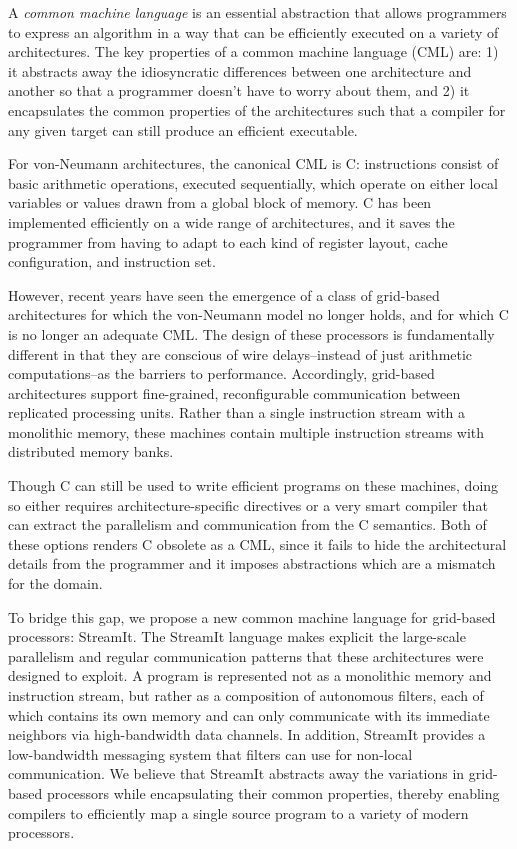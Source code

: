 \documentclass{sig-alternate}
\begin{document}
A {\it common machine language} is an essential abstraction that
allows programmers to express an algorithm in a way that can be
efficiently executed on a variety of architectures.  The key
properties of a common machine language (CML) are: 1) it abstracts
away the idiosyncratic differences between one architecture and
another so that a programmer doesn't have to worry about them, and 2)
it encapsulates the common properties of the architectures such that a
compiler for any given target can still produce an efficient
executable.

For von-Neumann architectures, the canonical CML is C: instructions
consist of basic arithmetic operations, executed sequentially, which
operate on either local variables or values drawn from a global block
of memory.  C has been implemented efficiently on a wide range of
architectures, and it saves the programmer from having to adapt to
each kind of register layout, cache configuration, and instruction
set.

However, recent years have seen the emergence of a class of grid-based
architectures \cite{smartmemories, raw, trips} for which the
von-Neumann model no longer holds, and for which C is no longer an
adequate CML.  The design of these processors is fundamentally
different in that they are conscious of wire delays--instead of just
arithmetic computations--as the barriers to performance.  Accordingly,
grid-based architectures support fine-grained, reconfigurable
communication between replicated processing units.  Rather than a
single instruction stream with a monolithic memory, these machines
contain multiple instruction streams with distributed memory banks.

Though C can still be used to write efficient programs on these
machines, doing so either requires architecture-specific directives or
a very smart compiler that can extract the parallelism and
communication from the C semantics.  Both of these options renders C
obsolete as a CML, since it fails to hide the architectural details
from the programmer and it imposes abstractions which are a mismatch
for the domain.

To bridge this gap, we propose a new common machine language for
grid-based processors: StreamIt.  The StreamIt language makes explicit
the large-scale parallelism and regular communication patterns that
these architectures were designed to exploit.  A program is
represented not as a monolithic memory and instruction stream, but
rather as a composition of autonomous filters, each of which contains
its own memory and can only communicate with its immediate neighbors
via high-bandwidth data channels.  In addition, StreamIt provides a
low-bandwidth messaging system that filters can use for non-local
communication.  We believe that StreamIt abstracts away the variations
in grid-based processors while encapsulating their common properties,
thereby enabling compilers to efficiently map a single source program
to a variety of modern processors.
\end{document}
